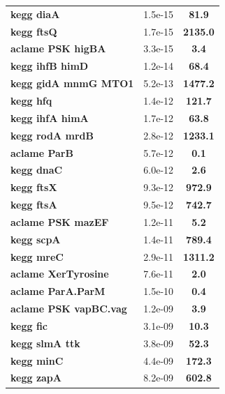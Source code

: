 \begin{landscape}
\begin{table}
{\begin{minipage}[t]{0.3\textwidth}
\begin{tabular}{>{\bfseries}p{\textwidth}cc}
\rowcolor{posit}kegg diaA&1.5e-15&\textbf{\colorbox{colorpowerxxxx}{81.9}}\\
\rowcolor{posit}kegg ftsQ&1.7e-15&\textbf{\colorbox{colorpowerxxxx}{2135.0}}\\
\rowcolor{posit}aclame PSK higBA&3.3e-15&\textbf{\colorbox{colorpowerx}{3.4}}\\
\rowcolor{posit}kegg ihfB himD&1.2e-14&\textbf{\colorbox{colorpowerxxxx}{68.4}}\\
\rowcolor{posit}kegg gidA mnmG MTO1&5.2e-13&\textbf{\colorbox{colorpowerxxxx}{1477.2}}\\
\rowcolor{posit}kegg hfq&1.4e-12&\textbf{\colorbox{colorpowerxxxx}{121.7}}\\
\rowcolor{posit}kegg ihfA himA&1.7e-12&\textbf{\colorbox{colorpowerxxxx}{63.8}}\\
\rowcolor{posit}kegg rodA mrdB&2.8e-12&\textbf{\colorbox{colorpowerxxxx}{1233.1}}\\
\rowcolor{posit}aclame ParB&5.7e-12&\textbf{\colorbox{colorpowernegxx}{0.1}}\\
\rowcolor{posit}kegg dnaC&6.0e-12&\textbf{\colorbox{colorpower}{2.6}}\\
\rowcolor{posit}kegg ftsX&9.3e-12&\textbf{\colorbox{colorpowerxxxx}{972.9}}\\
\rowcolor{posit}kegg ftsA&9.5e-12&\textbf{\colorbox{colorpowerxxxx}{742.7}}\\
\rowcolor{posit}aclame PSK mazEF&1.2e-11&\textbf{\colorbox{colorpowerx}{5.2}}\\
\rowcolor{posit}kegg scpA&1.4e-11&\textbf{\colorbox{colorpowerxxxx}{789.4}}\\
\rowcolor{posit}kegg mreC&2.9e-11&\textbf{\colorbox{colorpowerxxxx}{1311.2}}\\
\rowcolor{posit}aclame XerTyrosine&7.6e-11&\textbf{\colorbox{colorpower}{2.0}}\\
\rowcolor{posit}aclame ParA.ParM&1.5e-10&\textbf{\colorbox{colorpowernegx}{0.4}}\\
\rowcolor{posit}aclame PSK vapBC.vag&1.2e-09&\textbf{\colorbox{colorpowerx}{3.9}}\\
\rowcolor{posit}kegg fic&3.1e-09&\textbf{\colorbox{colorpowerxx}{10.3}}\\
\rowcolor{posit}kegg slmA ttk&3.8e-09&\textbf{\colorbox{colorpowerxxx}{52.3}}\\
\rowcolor{posit}kegg minC&4.4e-09&\textbf{\colorbox{colorpowerxxxx}{172.3}}\\
\rowcolor{posit}kegg zapA&8.2e-09&\textbf{\colorbox{colorpowerxxxx}{602.8}}\\

\end{tabular}
\end{minipage}}
\end{table}
\end{landscape}
